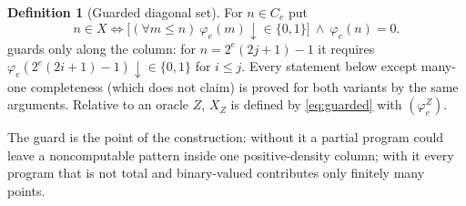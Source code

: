 \documentclass[11pt,letterpaper]{article}
\theoremstyle{definition}
\newtheorem{definition}{Definition}[section]
\numberwithin{equation}{section}
\newcommand{\dn}{{\downarrow}}
\newcommand{\src}[1]{\leavevmode{\sffamily\footnotesize\color{Steel}[#1]}}
\newcommand{\rep}[1]{\leavevmode{\sffamily\small\color{Steel}R#1}}
\begin{document}
\begin{definition}[Guarded diagonal set]\label{def:guarded}\src{R8, R9; variant R5}
For $n\in C_e$ put
\begin{equation}\label{eq:guarded}
 n\in X\iff\bigl[(\forall m\le n)\ \varphi_e(m)\dn\in\{0,1\}\bigr]\ \wedge\ \varphi_e(n)=0 .
\end{equation}
\rep5 guards only along the column: for $n=2^e(2j+1)-1$ it requires $\varphi_e(2^e(2i+1)-1)\dn\in\{0,1\}$ for $i\le j$. Every statement below except many-one completeness (which \rep5 does not claim) is proved for both variants by the same arguments. Relative to an oracle $Z$, $X_Z$ is defined by \eqref{eq:guarded} with $(\varphi_e^Z)$.
\end{definition}
The guard is the point of the construction: without it a partial program could leave a noncomputable pattern inside one positive-density column; with it every program that is not total and binary-valued contributes only finitely many points.
\end{document}
